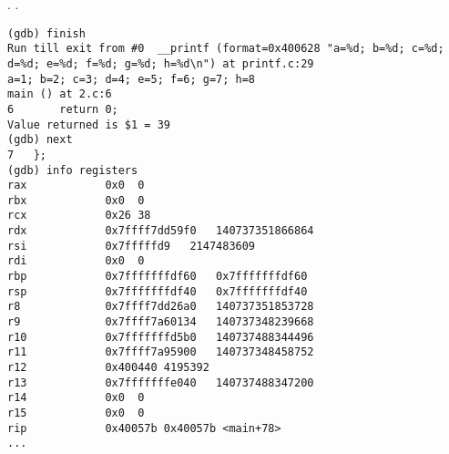 .
\RIP {} 
.

\begin{lstlisting}
(gdb) finish
Run till exit from #0  __printf (format=0x400628 "a=%d; b=%d; c=%d; d=%d; e=%d; f=%d; g=%d; h=%d\n") at printf.c:29
a=1; b=2; c=3; d=4; e=5; f=6; g=7; h=8
main () at 2.c:6
6		return 0;
Value returned is $1 = 39
(gdb) next
7	};
(gdb) info registers
rax            0x0	0
rbx            0x0	0
rcx            0x26	38
rdx            0x7ffff7dd59f0	140737351866864
rsi            0x7fffffd9	2147483609
rdi            0x0	0
rbp            0x7fffffffdf60	0x7fffffffdf60
rsp            0x7fffffffdf40	0x7fffffffdf40
r8             0x7ffff7dd26a0	140737351853728
r9             0x7ffff7a60134	140737348239668
r10            0x7fffffffd5b0	140737488344496
r11            0x7ffff7a95900	140737348458752
r12            0x400440	4195392
r13            0x7fffffffe040	140737488347200
r14            0x0	0
r15            0x0	0
rip            0x40057b	0x40057b <main+78>
...
\end{lstlisting}

